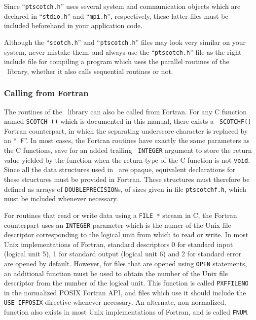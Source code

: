 Since ``{\tt ptscotch.h}'' uses several system and communication
objects which are declared in ``{\tt stdio.h}'' and ``{\tt mpi.h}'',
respectively, these latter files must be included beforehand
in your application code.

Although the ``{\tt scotch.h}'' and ``{\tt ptscotch.h}'' files may
look very similar on your system, never mistake them, and always use
the ``{\tt ptscotch.h}'' file as the right include file for compiling
a program which uses the parallel routines of the \libscotch\ library,
whether it also calls sequential routines or not.

\subsubsection{Calling from Fortran}

The routines of the \libscotch\ library can also be called from
Fortran. For any C function named {\tt SCOTCH\_()} which is documented in this manual, there exists a {\tt
SCOTCHF()} Fortran counterpart, in which
the separating underscore character is replaced by an ``{\tt
F}''. In most cases, the Fortran routines have exactly the same
parameters as the C functions, save for an added trailing {\tt
INTEGER} argument to store the return value yielded by the function
when the return type of the C function is not {\tt void}.
\\

Since all the data structures used in \libscotch\ are
opaque, equivalent declarations for these structures must
be provided in Fortran. These structures must therefore
be defined as arrays of {\tt DOUBLEPRECISION}s, of sizes
given in file {\tt ptscotchf.h}, which must be included whenever
necessary.

For routines that read or write data using a {\tt FILE~*} stream
in C, the Fortran counterpart uses an {\tt INTEGER} parameter which
is the numer of the Unix file descriptor corresponding to the logical
unit from which to read or write. In most Unix implementations of
Fortran, standard descriptors 0 for standard input (logical unit 5),
1 for standard output (logical unit 6) and 2 for standard error are
opened by default. However, for files that are opened using
{\tt OPEN} statements, an additional function must be used to obtain
the number of the Unix file descriptor from the number of the logical
unit. This function is called \texttt{PXFFILENO} in the normalized
POSIX Fortran API, and files which use it should include the
\texttt{USE IFPOSIX} directive whenever necessary. An alternate, non
normalized, function also exists in most Unix implementations of
Fortran, and is called {\tt FNUM}.

